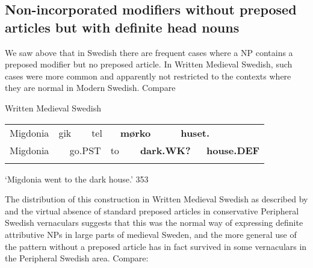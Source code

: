 \subsection{\rmfamily Non-incorporated modifiers without preposed articles but with definite head nouns}
\label{bkm:Ref154984033}
\begin{styleBodyTextFirst}
We saw above that in Swedish there are frequent cases where a NP contains a preposed modifier but no preposed article. In Written Medieval Swedish, such cases were more common and apparently not restricted to the contexts where they are normal in Modern Swedish. Compare 

\end{styleBodyTextFirst}

\begin{listWWNumileveli}
\item {}

\begin{styleExample}
Written Medieval Swedish

\end{styleExample}

\end{listWWNumileveli}

\begin{tabular}{llllllllll}
\lsptoprule
Migdonia & \multicolumn{2}{l}{gik

} & \multicolumn{2}{l}{tel

} & \multicolumn{2}{l}{{\bfseries mørko}

} & \multicolumn{2}{l}{{\bfseries huset.}

} & \\
\multicolumn{2}{l}{Migdonia

} & \multicolumn{2}{l}{go.PST

} & \multicolumn{2}{l}{to

} & \multicolumn{2}{l}{{\bfseries dark.WK?}

} & \multicolumn{2}{l}{{\bfseries house.DEF}

}\\
\lspbottomrule
\end{tabular}

\begin{styleTranslation}
‘Migdonia went to the dark house.’ 353

\end{styleTranslation}

\begin{styleBodyTextFirst}
The distribution of this construction in Written Medieval Swedish as described by \citet{Larm1936} and the virtual absence of standard preposed articles in conservative Peripheral Swedish vernaculars suggests that this was the normal way of expressing definite attributive NPs in large parts of medieval Sweden, and the more general use of the pattern without a preposed article has in fact survived in some vernaculars in the Peripheral Swedish area. Compare: 

\end{styleBodyTextFirst}

